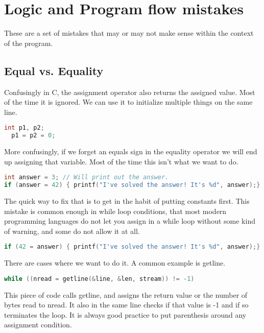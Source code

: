 \section{Logic and Program flow mistakes}

These are a set of mistakes that may or may not make sense within the context of the program.

\subsection{Equal vs. Equality}

Confusingly in C, the assignment operator also returns the assigned value.
Most of the time it is ignored.
We can use it to initialize multiple things on the same line.

\begin{lstlisting}[language=C]
  int p1, p2;
  p1 = p2 = 0;
\end{lstlisting}

More confusingly, if we forget an equals sign in the equality operator we will end up assigning that variable.
Most of the time this isn't what we want to do.

\begin{lstlisting}[language=C]
int answer = 3; // Will print out the answer.
if (answer = 42) { printf("I've solved the answer! It's %d", answer);}
\end{lstlisting}

The quick way to fix that is to get in the habit of putting constants first.
This mistake is common enough in while loop conditions, that most modern programming languages do not let you assign in a while loop without some kind of warning, and some do not allow it at all.

\begin{lstlisting}[language=C]
if (42 = answer) { printf("I've solved the answer! It's %d", answer);}
\end{lstlisting}

There are cases where we want to do it.
A common example is getline.

\begin{lstlisting}[language=C]
while ((nread = getline(&line, &len, stream)) != -1)
\end{lstlisting}

This piece of code calls getline, and assigns the return value or the number of bytes read to nread.
It also in the same line checks if that value is -1 and if so terminates the loop.
It is always good practice to put parenthesis around any assignment condition.

